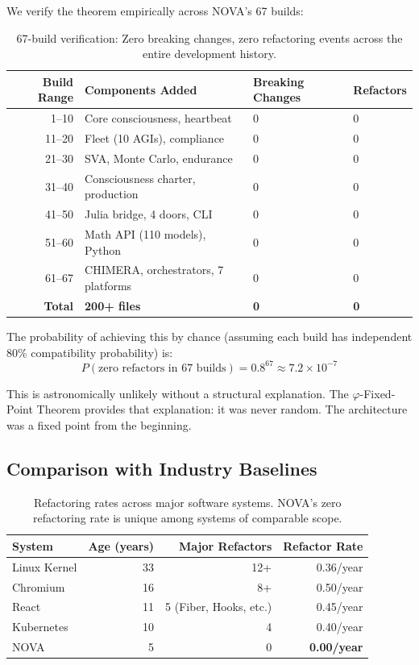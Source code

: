 \documentclass[12pt]{article}
\newcommand{\PHI}{\varphi}
\begin{document}
We verify the theorem empirically across NOVA's 67 builds:

\begin{table}[htbp]
\centering
\small
\begin{tabular}{@{}rlll@{}}
\toprule
\textbf{Build Range} & \textbf{Components Added} & \textbf{Breaking Changes} & \textbf{Refactors} \\
\midrule
1–10 & Core consciousness, heartbeat & 0 & 0 \\
11–20 & Fleet (10 AGIs), compliance & 0 & 0 \\
21–30 & SVA, Monte Carlo, endurance & 0 & 0 \\
31–40 & Consciousness charter, production & 0 & 0 \\
41–50 & Julia bridge, 4 doors, CLI & 0 & 0 \\
51–60 & Math API (110 models), Python & 0 & 0 \\
61–67 & CHIMERA, orchestrators, 7 platforms & 0 & 0 \\
\midrule
\textbf{Total} & \textbf{200+ files} & \textbf{0} & \textbf{0} \\
\bottomrule
\end{tabular}
\caption{67-build verification: Zero breaking changes, zero refactoring events across the entire development history.}
\end{table}

The probability of achieving this by chance (assuming each build has independent 80\% compatibility probability) is:
\[
P(\text{zero refactors in 67 builds}) = 0.8^{67} \approx 7.2 \times 10^{-7}
\]

This is astronomically unlikely without a structural explanation. The $\PHI$-Fixed-Point Theorem provides that explanation: it was never random. The architecture was a fixed point from the beginning.

\subsection{Comparison with Industry Baselines}

\begin{table}[htbp]
\centering
\small
\begin{tabular}{@{}lrrr@{}}
\toprule
\textbf{System} & \textbf{Age (years)} & \textbf{Major Refactors} & \textbf{Refactor Rate} \\
\midrule
Linux Kernel & 33 & 12+ & 0.36/year \\
Chromium & 16 & 8+ & 0.50/year \\
React & 11 & 5 (Fiber, Hooks, etc.) & 0.45/year \\
Kubernetes & 10 & 4 & 0.40/year \\
NOVA & 5 & 0 & \textbf{0.00/year} \\
\bottomrule
\end{tabular}
\caption{Refactoring rates across major software systems. NOVA's zero refactoring rate is unique among systems of comparable scope.}
\end{table}
\end{document}
